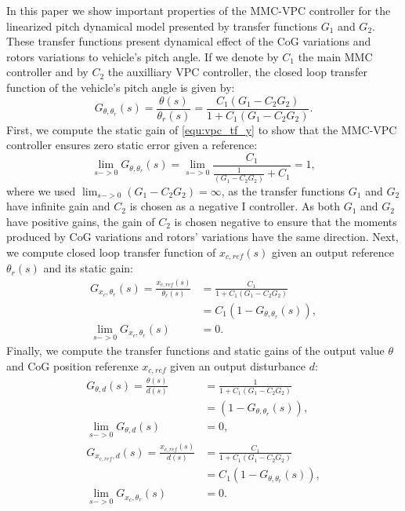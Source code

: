 In this paper we show important properties of the MMC-VPC controller for the linearized pitch dynamical model presented by transfer functions $G_1$ and $G_2$. These transfer functions present dynamical effect of the CoG variations and rotors variations to vehicle's pitch angle. If we denote by $C_1$ the main MMC controller and by $C_2$ the auxilliary VPC controller, the closed loop transfer function of the vehicle's pitch angle is given by:
\begin{equation}
 G_{\theta,\theta_r}(s) = \frac{\theta(s)}{\theta_r(s)} = \frac{C_1(G_1 - C_2 G_2)}{1 + C_1(G_1 - C_2 G_2)}.
\label{equ:vpc_tf_y}
\end{equation}
First, we compute the static gain of \eqref{equ:vpc_tf_y} to show that the MMC-VPC controller ensures zero static error given a reference:
\begin{equation}
\lim_{s->0} G_{\theta,\theta_r}(s) = \lim_{s->0} \frac{C_1}{\frac{1}{(G_1 - C_2 G_2)} + C_1} = 1,
\label{equ:vpc_tf_y_gain}
\end{equation}
where we used $\lim_{s->0} (G_1 - C_2 G_2) = \infty$, as the transfer functions $G_1$ and $G_2$ have infinite gain and $C_2$ is chosen as a negative I controller. As both $G_1$ and $G_2$ have positive gains, the gain of $C_2$ is chosen negative to ensure that the moments produced by CoG variations and rotors' variations have the same direction.
Next, we compute closed loop transfer function of $x_{c,ref}(s)$ given an output reference $\theta_r(s)$ and its static gain:
\begin{align}
 G_{x_c,\theta_r}(s) = \frac{x_{c,ref}(s)}{\theta_r(s)} &= \frac{C_1}{1 + C_1(G_1 - C_2 G_2)} \nonumber \\
                                                           &= C_1 (1 - G_{\theta,\theta_r}(s)) \label{equ:vpc_tf_u_yr},\\
\lim_{s->0} G_{x_c,\theta_r}(s) &= 0\label{equ:vpc_tf_u_yr_gain}.
\end{align}
Finally, we compute the transfer functions and static gains of the output value  $\theta$ and CoG position referenxe $x_{c,ref}$ given an output disturbance $d$:
\begin{align}
 G_{\theta,d}(s) = \frac{\theta(s)}{d(s)} &= \frac{1}{1 + C_1(G_1 - C_2 G_2)} \nonumber \\
  										 &= (1 - G_{\theta,\theta_r}(s)), \label{equ:vpc_tf_y_d}\\
\lim_{s->0} G_{\theta,d}(s) &=  0, \label{equ:vpc_tf_y_d_gain} \\
 G_{x_{c,ref},d}(s) = \frac{x_{c,ref}(s)}{d(s)} &= \frac{C_1}{1 + C_1(G_1 - C_2 G_2)} \nonumber \\ 
 											&= C_1 (1 - G_{\theta,\theta_r}(s)), \label{equ:vpc_tf_u_d}\\
\lim_{s->0} G_{x_c,\theta_r}(s) &=  0. \label{equ:vpc_tf_u_d_gain}
\end{align}
